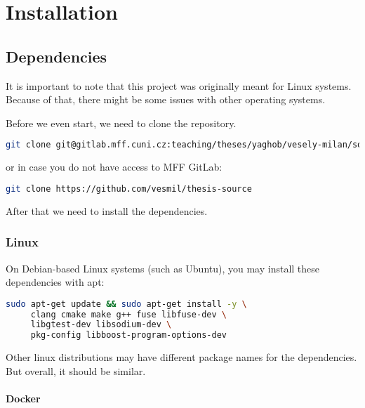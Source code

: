 \chapter{Installation}

\section{Dependencies}\label{sec:dependencies}

It is important to note that this project was originally meant for Linux systems.
Because of that, there might be some issues with other operating systems.

Before we even start, we need to clone the repository.

\begin{lstlisting}[language=bash, basicstyle=\ttfamily\small]
git clone git@gitlab.mff.cuni.cz:teaching/theses/yaghob/vesely-milan/source-code.git
\end{lstlisting}

or in case you do not have access to MFF GitLab:

\begin{lstlisting}[language=bash, basicstyle=\ttfamily\small]
git clone https://github.com/vesmil/thesis-source
\end{lstlisting}

After that we need to install the dependencies.

\subsection*{Linux}

On Debian-based Linux systems (such as Ubuntu), you may install these dependencies with apt:

\begin{lstlisting}[language=bash, basicstyle=\ttfamily\small]
sudo apt-get update && sudo apt-get install -y \
     clang cmake make g++ fuse libfuse-dev \
     libgtest-dev libsodium-dev \
     pkg-config libboost-program-options-dev
\end{lstlisting}

Other linux distributions may have different package names for the dependencies.
But overall, it should be similar.

\subsubsection*{Docker}\label{subsubsec:docker-guide}

